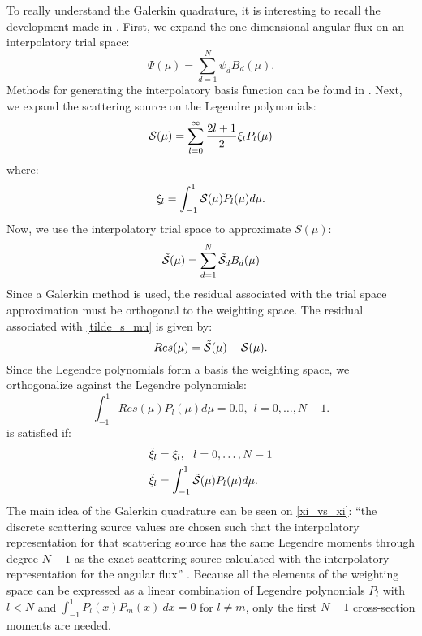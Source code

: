To really understand the Galerkin quadrature, it is interesting to recall 
the development made in \cite{galerkin_morel}. First, we expand the
one-dimensional angular flux on an interpolatory trial space:
\begin{equation}
\Psi(\mu) = \sum_{d=1}^N \psi_d B_d(\mu).
\label{psi_b}
\end{equation}
Methods for generating the interpolatory basis function can be found in 
\cite{galerkin_morel}. Next, we expand the scattering source on the Legendre
polynomials:
\begin{equation}
\mc{S}(\mu) = \sum_{l=0}^{\infty} \frac{2l+1}{2} \xi_l P_l(\mu)
\label{S_mu_2}
\end{equation}
where:
\begin{equation}
  \xi_l = \int_{-1}^1 \mathcal{S}(\mu) P_l(\mu) d\mu.
\end{equation}
Now, we use the interpolatory trial space to approximate $S(\mu)$:
\begin{equation}
\tilde{\mc{S}}(\mu) = \sum_{d=1}^N \tilde{\mc{S}}_d B_d(\mu)
\label{tilde_s_mu}
\end{equation}
Since a Galerkin method is used, the residual associated with the trial space 
approximation must be orthogonal to the weighting
space. The residual associated with \cref{tilde_s_mu} is given by:
\begin{equation}
Res(\mu) = \tilde{\mc{S}}(\mu) - \mc{S}(\mu).
\label{R_mu}
\end{equation}
Since the Legendre polynomials form a basis the weighting space, we
orthogonalize against the Legendre polynomials:
\begin{equation}
\int_{-1}^1 Res(\mu) P_l(\mu) d\mu = 0.0,\ \ l=0,\hdots,N-1.
\label{int_r_mu}
\end{equation}
 is satisfied if:
\begin{align}
&\tilde{\xi}_l = \xi_l,\ \ l=0,\hdots,N-1 \label{xi_vs_xi}\\
&\tilde{\xi}_l = \int_{-1}^1 \tilde{\mc{S}}(\mu) P_l(\mu) d\mu.
\end{align}
The main idea of the Galerkin quadrature can be seen on \cref{xi_vs_xi}: ``the
discrete scattering source values are chosen such that the interpolatory
representation for that scattering source has the same Legendre moments
through degree $N-1$ as the exact scattering source calculated with the
interpolatory representation for the angular flux'' \cite{galerkin_morel}. 
Because all the elements of the weighting space can be expressed as a linear
combination of Legendre polynomials $P_l$ with $l<N$ and $\int_{-1}^{1}
P_l(x)P_m(x)\ dx=0$ for $l\neq m$, only the first $N-1$ cross-section moments
are needed.

